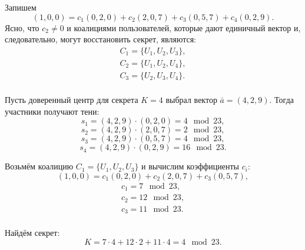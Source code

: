 Запишем
    \[ (1,0,0) = c_1 (0,2,0) + c_2 (2,0,7) + c_3 (0,5,7) + c_4 (0,2,9). \]
Ясно, что $c_2 \neq 0$ и коалициями пользователей, которые дают единичный вектор и, следовательно, могут восстановить секрет, являются:
\[ \begin{array}{l}
    C_1 = \{ U_1, U_2, U_3 \}, \\
    C_2 = \{ U_1, U_2, U_4 \}, \\
    C_3 = \{ U_2, U_3, U_4 \}. \\
\end{array} \]

Пусть доверенный центр для секрета $K = 4$ выбрал вектор $\bar{a} = (4, 2, 9)$. Тогда участники получают тени:
    \[ s_1 = (4,2,9) \cdot (0,2,0) = 4 \mod 23, \]
    \[ s_2 = (4,2,9) \cdot (2,0,7) = 2 \mod 23, \]
    \[ s_3 = (4,2,9) \cdot (0,5,7) = 4 \mod 23, \]
    \[ s_4 = (4,2,9) \cdot (0,2,9) = 16 \mod 23. \]

Возьмём коалицию $C_1 = \{ U_1, U_2, U_3 \}$ и вычислим коэффициенты $c_i$:
    \[ (1,0,0) = c_1 (0,2,0) + c_2 (2,0,7) + c_3 (0,5,7), \]
\[ \begin{array}{l}
    c_1 = 7 \mod 23, \\
    c_2 = 12 \mod 23, \\
    c_3 = 11 \mod 23. \\
\end{array} \]

Найдём секрет:
    \[ K = 7 \cdot 4 + 12 \cdot 2 + 11 \cdot 4 = 4 \mod 23.\]
\exampleend

